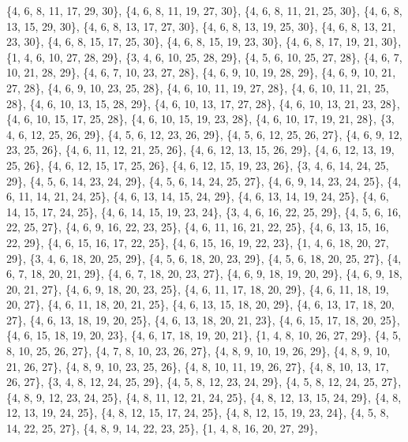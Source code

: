\documentclass[11pt,a4paper]{article}
\begin{document}
{\{4, 6, 8, 11, 17, 29, 30\}, \{4, 6, 8, 11, 19, 27, 30\}, \{4, 6, 8, 11, 21, 25, 30\}, \{4, 6, 8, 13, 15, 29, 30\}, \{4, 6, 8, 13, 17, 27, 30\},
\{4, 6, 8, 13, 19, 25, 30\}, \{4, 6, 8, 13, 21, 23, 30\}, \{4, 6, 8, 15, 17, 25, 30\}, \{4, 6, 8, 15, 19, 23, 30\}, \{4, 6, 8, 17, 19, 21, 30\},
\{1, 4, 6, 10, 27, 28, 29\}, \{3, 4, 6, 10, 25, 28, 29\}, \{4, 5, 6, 10, 25, 27, 28\}, \{4, 6, 7, 10, 21, 28, 29\}, \{4, 6, 7, 10, 23, 27, 28\},
\{4, 6, 9, 10, 19, 28, 29\}, \{4, 6, 9, 10, 21, 27, 28\}, \{4, 6, 9, 10, 23, 25, 28\}, \{4, 6, 10, 11, 19, 27, 28\}, \{4, 6, 10, 11, 21, 25, 28\},
\{4, 6, 10, 13, 15, 28, 29\}, \{4, 6, 10, 13, 17, 27, 28\}, \{4, 6, 10, 13, 21, 23, 28\}, \{4, 6, 10, 15, 17, 25, 28\}, \{4, 6, 10, 15, 19, 23, 28\},
\{4, 6, 10, 17, 19, 21, 28\}, \{3, 4, 6, 12, 25, 26, 29\}, \{4, 5, 6, 12, 23, 26, 29\}, \{4, 5, 6, 12, 25, 26, 27\}, \{4, 6, 9, 12, 23, 25, 26\},
\{4, 6, 11, 12, 21, 25, 26\}, \{4, 6, 12, 13, 15, 26, 29\}, \{4, 6, 12, 13, 19, 25, 26\}, \{4, 6, 12, 15, 17, 25, 26\}, \{4, 6, 12, 15, 19, 23, 26\},
\{3, 4, 6, 14, 24, 25, 29\}, \{4, 5, 6, 14, 23, 24, 29\}, \{4, 5, 6, 14, 24, 25, 27\}, \{4, 6, 9, 14, 23, 24, 25\}, \{4, 6, 11, 14, 21, 24, 25\},
\{4, 6, 13, 14, 15, 24, 29\}, \{4, 6, 13, 14, 19, 24, 25\}, \{4, 6, 14, 15, 17, 24, 25\}, \{4, 6, 14, 15, 19, 23, 24\}, \{3, 4, 6, 16, 22, 25, 29\},
\{4, 5, 6, 16, 22, 25, 27\}, \{4, 6, 9, 16, 22, 23, 25\}, \{4, 6, 11, 16, 21, 22, 25\}, \{4, 6, 13, 15, 16, 22, 29\}, \{4, 6, 15, 16, 17, 22, 25\},
\{4, 6, 15, 16, 19, 22, 23\}, \{1, 4, 6, 18, 20, 27, 29\}, \{3, 4, 6, 18, 20, 25, 29\}, \{4, 5, 6, 18, 20, 23, 29\}, \{4, 5, 6, 18, 20, 25, 27\},
\{4, 6, 7, 18, 20, 21, 29\}, \{4, 6, 7, 18, 20, 23, 27\}, \{4, 6, 9, 18, 19, 20, 29\}, \{4, 6, 9, 18, 20, 21, 27\}, \{4, 6, 9, 18, 20, 23, 25\},
\{4, 6, 11, 17, 18, 20, 29\}, \{4, 6, 11, 18, 19, 20, 27\}, \{4, 6, 11, 18, 20, 21, 25\}, \{4, 6, 13, 15, 18, 20, 29\}, \{4, 6, 13, 17, 18, 20, 27\},
\{4, 6, 13, 18, 19, 20, 25\}, \{4, 6, 13, 18, 20, 21, 23\}, \{4, 6, 15, 17, 18, 20, 25\}, \{4, 6, 15, 18, 19, 20, 23\}, \{4, 6, 17, 18, 19, 20, 21\},
\{1, 4, 8, 10, 26, 27, 29\}, \{4, 5, 8, 10, 25, 26, 27\}, \{4, 7, 8, 10, 23, 26, 27\}, \{4, 8, 9, 10, 19, 26, 29\}, \{4, 8, 9, 10, 21, 26, 27\},
\{4, 8, 9, 10, 23, 25, 26\}, \{4, 8, 10, 11, 19, 26, 27\}, \{4, 8, 10, 13, 17, 26, 27\}, \{3, 4, 8, 12, 24, 25, 29\}, \{4, 5, 8, 12, 23, 24, 29\},
\{4, 5, 8, 12, 24, 25, 27\}, \{4, 8, 9, 12, 23, 24, 25\}, \{4, 8, 11, 12, 21, 24, 25\}, \{4, 8, 12, 13, 15, 24, 29\}, \{4, 8, 12, 13, 19, 24, 25\},
\{4, 8, 12, 15, 17, 24, 25\}, \{4, 8, 12, 15, 19, 23, 24\}, \{4, 5, 8, 14, 22, 25, 27\}, \{4, 8, 9, 14, 22, 23, 25\}, \{1, 4, 8, 16, 20, 27, 29\},
}
\end{document}
